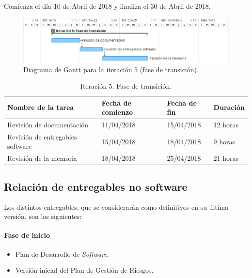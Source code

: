 \documentclass[twoside]{report}
\begin{document}
Comienza el día 10 de Abril de 2018 y finaliza el 30 de Abril de 2018.

\begin{figure}[h]
\begin{center}
\includegraphics[width=\textwidth]{images/gantt/ite5}
\caption{Diagrama de Gantt para la iteración 5 (fase de transición).}
\end{center}
\end{figure}


\begin{table}[H]
\centering
\begin{tabular}{|l|l|l|l|}
\hline
Nombre de la tarea              & Fecha de comienzo & Fecha de fin & Duración \\ \hline
Revisión de documentación       & 11/04/2018        & 15/04/2018   & 12 horas   \\ \hline
Revisión de entregables software & 15/04/2018        & 18/04/2018   & 9 horas   \\ \hline
Revisión de la memoria & 18/04/2018        & 25/04/2018   & 21 horas   \\ \hline
\end{tabular}
\caption{Iteración 5. Fase de transición.}
\end{table}

\subsection{Relación de entregables no software}

Los distintos entregables, que se considerarán como definitivos en su última versión, son los siguientes:

\paragraph{Fase de inicio\\}
\begin{itemize}
\item Plan de Desarrollo de \textit{Software}.
\item Versión inicial del Plan de Gestión de Riesgos.
\end{itemize}
\end{document}
